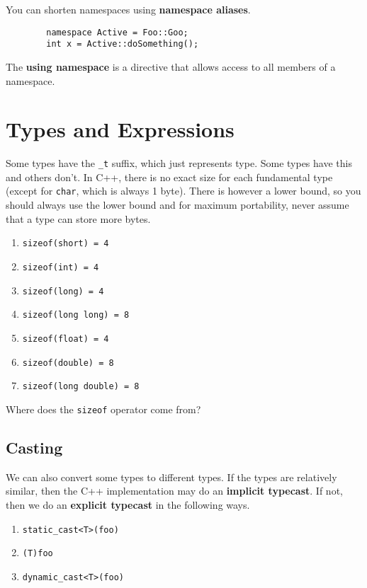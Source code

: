 \documentclass{article}
\begin{document}
    \begin{lemma}
      You can shorten namespaces using \textbf{namespace aliases}. 
      \begin{lstlisting}
        namespace Active = Foo::Goo; 
        int x = Active::doSomething(); 
      \end{lstlisting}
    \end{lemma}

    \begin{lemma}
      The \textbf{using namespace} is a directive that allows access to all members of a namespace. 
    \end{lemma}

\section{Types and Expressions} 

  Some types have the \texttt{\_t} suffix, which just represents type. Some types have this and others don't. In C++, there is no exact size for each fundamental type (except for \texttt{char}, which is always 1 byte). There is however a lower bound, so you should always use the lower bound and for maximum portability, never assume that a type can store more bytes. 
  \begin{enumerate}
    \item \texttt{sizeof(short) = 4}
    \item \texttt{sizeof(int) = 4}
    \item \texttt{sizeof(long) = 4}
    \item \texttt{sizeof(long long) = 8}
    \item \texttt{sizeof(float) = 4}
    \item \texttt{sizeof(double) = 8}
    \item \texttt{sizeof(long double) = 8}
  \end{enumerate} 

  Where does the \texttt{sizeof} operator come from? 

  \subsection{Casting}

    We can also convert some types to different types. If the types are relatively similar, then the C++ implementation may do an \textbf{implicit typecast}. If not, then we do an \textbf{explicit typecast} in the following ways. 
    \begin{enumerate}
      \item \texttt{static\_cast<T>(foo)}
      \item \texttt{(T)foo} 
      \item \texttt{dynamic\_cast<T>(foo)}
    \end{enumerate} 
\end{document}

